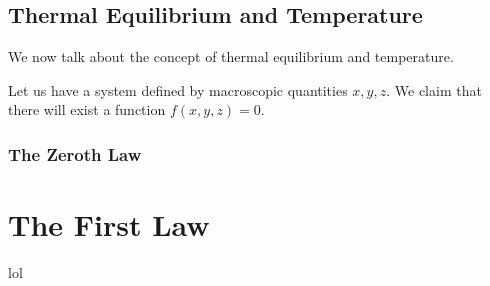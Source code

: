 \documentclass[a4paper]{article}
\begin{document}
   \subsection{Thermal Equilibrium and Temperature}
   We now talk about the concept of thermal equilibrium and temperature. 
   \begin{tcolorbox}[colback=blue!5!white,colframe=blue!75!black,title=Theorem]
       Let us have a system defined 
   by macroscopic quantities \(x,y,z\). We claim that there will exist a function \(f(x,y,z) = 0\).    
   \end{tcolorbox}
   
   \subsubsection{The Zeroth Law}
   
   \section{The First Law}
   lol
    


   
\end{document}

